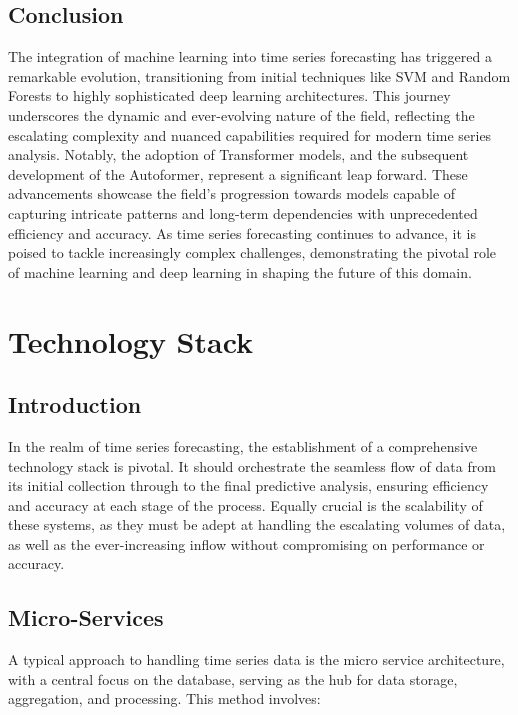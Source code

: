 \subsection{Conclusion}
The integration of machine learning into time series forecasting has triggered a remarkable evolution, transitioning from initial techniques like SVM and Random Forests to highly sophisticated deep learning architectures. This journey underscores the dynamic and ever-evolving nature of the field, reflecting the escalating complexity and nuanced capabilities required for modern time series analysis. Notably, the adoption of Transformer models, and the subsequent development of the Autoformer, represent a significant leap forward. These advancements showcase the field's progression towards models capable of capturing intricate patterns and long-term dependencies with unprecedented efficiency and accuracy. As time series forecasting continues to advance, it is poised to tackle increasingly complex challenges, demonstrating the pivotal role of machine learning and deep learning in shaping the future of this domain.


\section{Technology Stack}

\subsection{Introduction}
In the realm of time series forecasting, the establishment of a comprehensive technology stack is pivotal. It should orchestrate the seamless flow of data from its initial collection through to the final predictive analysis, ensuring efficiency and accuracy at each stage of the process. Equally crucial is the scalability of these systems, as they must be adept at handling the escalating volumes of data, as well as the ever-increasing inflow without compromising on performance or accuracy.

\subsection{Micro-Services}
A typical approach to handling time series data is the micro service architecture, with a central focus on the database, serving as the hub for data storage, aggregation, and processing. This method involves:

